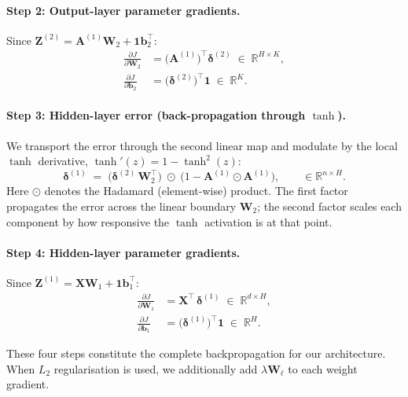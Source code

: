 \documentclass[11pt]{article}
\newcommand{\R}{\mathbb{R}}
\newcommand{\bX}{\mathbf{X}}
\newcommand{\bW}{\mathbf{W}}
\newcommand{\bb}{\mathbf{b}}
\newcommand{\bZ}{\mathbf{Z}}
\newcommand{\bA}{\mathbf{A}}
\newcommand{\bone}{\mathbf{1}}
\begin{document}
\paragraph{Step 2: Output-layer parameter gradients.}
Since $\bZ^{(2)}=\bA^{(1)}\bW_2+\bone\bb_2^\top$:
\begin{align}
  \frac{\partial J}{\partial \bW_2}
  &= \bigl(\bA^{(1)}\bigr)^\top \boldsymbol{\delta}^{(2)}
  \;\in\;\R^{H\times K},
  \label{eq:gW2}\\[4pt]
  \frac{\partial J}{\partial \bb_2}
  &= \bigl(\boldsymbol{\delta}^{(2)}\bigr)^\top\bone
  \;\in\;\R^{K}.
  \label{eq:gb2}
\end{align}

\paragraph{Step 3: Hidden-layer error (back-propagation through $\tanh$).}
We transport the error through the second linear map and modulate by the local
$\tanh$ derivative, $\tanh'(z)=1-\tanh^2(z)$:
\begin{equation}\label{eq:delta1}
  \boldsymbol{\delta}^{(1)}
  \;=\;
  \bigl(\boldsymbol{\delta}^{(2)}\,\bW_2^\top\bigr)
  \;\odot\;
  \bigl(1-\bA^{(1)}\odot\bA^{(1)}\bigr),
  \qquad\in\R^{n\times H}.
\end{equation}
Here $\odot$ denotes the Hadamard (element-wise) product.  The first factor propagates the error
across the linear boundary $\bW_2$; the second factor scales each component by how responsive the
$\tanh$ activation is at that point.

\paragraph{Step 4: Hidden-layer parameter gradients.}
Since $\bZ^{(1)}=\bX\bW_1+\bone\bb_1^\top$:
\begin{align}
  \frac{\partial J}{\partial \bW_1}
  &= \bX^\top\,\boldsymbol{\delta}^{(1)}
  \;\in\;\R^{d\times H},
  \label{eq:gW1}\\[4pt]
  \frac{\partial J}{\partial \bb_1}
  &= \bigl(\boldsymbol{\delta}^{(1)}\bigr)^\top\bone
  \;\in\;\R^{H}.
  \label{eq:gb1}
\end{align}

These four steps constitute the complete backpropagation for our architecture.
When $L_2$ regularisation is used, we additionally add $\lambda\bW_\ell$ to each weight gradient.

\end{document}
